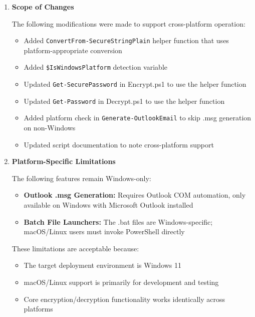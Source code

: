 \documentclass[11pt,letterpaper]{article}
\newcommand{\dmsection}[1]{\item \textbf{#1}\par}
\begin{document}
\begin{enumerate}
\begin{lstlisting}[language=PowerShell]
$IsWindowsPlatform = $PSVersionTable.PSEdition -eq 'Desktop' -or $IsWindows
\end{lstlisting}

\dmsection{Scope of Changes}

The following modifications were made to support cross-platform operation:

\begin{itemize}
    \item Added \texttt{ConvertFrom-SecureStringPlain} helper function that uses platform-appropriate conversion
    \item Added \texttt{\$IsWindowsPlatform} detection variable
    \item Updated \texttt{Get-SecurePassword} in Encrypt.ps1 to use the helper function
    \item Updated \texttt{Get-Password} in Decrypt.ps1 to use the helper function
    \item Added platform check in \texttt{Generate-OutlookEmail} to skip .msg generation on non-Windows
    \item Updated script documentation to note cross-platform support
\end{itemize}

\dmsection{Platform-Specific Limitations}

The following features remain Windows-only:

\begin{itemize}
    \item \textbf{Outlook .msg Generation:} Requires Outlook COM automation, only available on Windows with Microsoft Outlook installed
    \item \textbf{Batch File Launchers:} The .bat files are Windows-specific; macOS/Linux users must invoke PowerShell directly
\end{itemize}

These limitations are acceptable because:
\begin{itemize}
    \item The target deployment environment is Windows 11
    \item macOS/Linux support is primarily for development and testing
    \item Core encryption/decryption functionality works identically across platforms
\end{itemize}


\end{enumerate}
\end{document}
